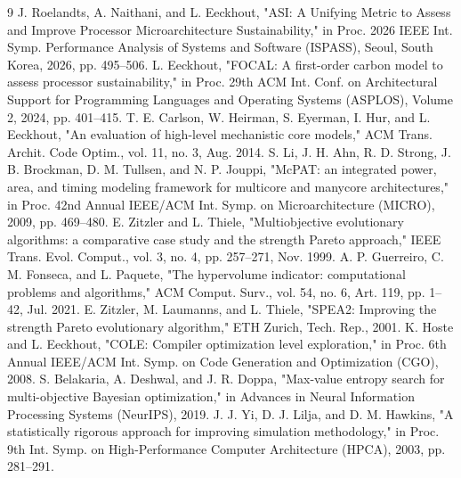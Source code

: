 \documentclass[12pt,a4paper,faculty=ea,language=en]{ugent-doc}
\begin{document}
\begin{thebibliography}{9}
    J. Roelandts, A. Naithani, and L. Eeckhout, "ASI: A Unifying Metric to Assess and Improve Processor Microarchitecture Sustainability," in Proc. 2026 IEEE Int. Symp. Performance Analysis of Systems and Software (ISPASS), Seoul, South Korea, 2026, pp. 495--506.
    L. Eeckhout, "FOCAL: A first-order carbon model to assess processor sustainability," in Proc. 29th ACM Int. Conf. on Architectural Support for Programming Languages and Operating Systems (ASPLOS), Volume 2, 2024, pp. 401--415.
    T. E. Carlson, W. Heirman, S. Eyerman, I. Hur, and L. Eeckhout, "An evaluation of high-level mechanistic core models," ACM Trans. Archit. Code Optim., vol. 11, no. 3, Aug. 2014.
    S. Li, J. H. Ahn, R. D. Strong, J. B. Brockman, D. M. Tullsen, and N. P. Jouppi, "McPAT: an integrated power, area, and timing modeling framework for multicore and manycore architectures," in Proc. 42nd Annual IEEE/ACM Int. Symp. on Microarchitecture (MICRO), 2009, pp. 469--480.
    E. Zitzler and L. Thiele, "Multiobjective evolutionary algorithms: a comparative case study and the strength Pareto approach," IEEE Trans. Evol. Comput., vol. 3, no. 4, pp. 257--271, Nov. 1999.
    A. P. Guerreiro, C. M. Fonseca, and L. Paquete, "The hypervolume indicator: computational problems and algorithms," ACM Comput. Surv., vol. 54, no. 6, Art. 119, pp. 1--42, Jul. 2021.
    E. Zitzler, M. Laumanns, and L. Thiele, "SPEA2: Improving the strength Pareto evolutionary algorithm," ETH Zurich, Tech. Rep., 2001.
    K. Hoste and L. Eeckhout, "COLE: Compiler optimization level exploration," in Proc. 6th Annual IEEE/ACM Int. Symp. on Code Generation and Optimization (CGO), 2008.
    S. Belakaria, A. Deshwal, and J. R. Doppa, "Max-value entropy search for multi-objective Bayesian optimization," in Advances in Neural Information Processing Systems (NeurIPS), 2019.
    J. J. Yi, D. J. Lilja, and D. M. Hawkins, "A statistically rigorous approach for improving simulation methodology," in Proc. 9th Int. Symp. on High-Performance Computer Architecture (HPCA), 2003, pp. 281--291.
\end{thebibliography}
\end{document}
